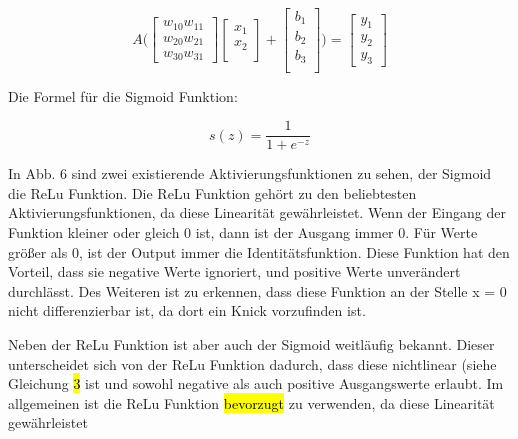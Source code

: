 \begin{equation}
\label{Feedforwards}
    
          A\Bigg(
         \begin{bmatrix}
           w_{10}  w_{11} \\     
           w_{20}  w_{21} \\           
           w_{30} w_{31}
          \end{bmatrix}
          \begin{bmatrix}
           x_{1} \\
           x_{2} \\
         \end{bmatrix}
         + 
         \begin{bmatrix}
           b_{1} \\
           b_{2} \\
           b_{3} \\
         \end{bmatrix}
            \Bigg)
          =
          \begin{bmatrix}
           y_{1} \\
           y_{2} \\
     
           y_{3}
         \end{bmatrix}
         
\end{equation}



Die Formel für die Sigmoid Funktion: 

\begin{equation}
\label{Sigmoid}
s(z) = \frac{1}{1+e^{-z}}
\end{equation}


In Abb. 6 sind zwei existierende Aktivierungsfunktionen zu sehen, der Sigmoid die ReLu Funktion. Die ReLu Funktion gehört zu den beliebtesten Aktivierungsfunktionen, da diese Linearität gewährleistet. Wenn der Eingang der Funktion kleiner oder gleich 0 ist, dann ist der Ausgang immer 0. Für Werte größer als 0, ist der Output immer die Identitätsfunktion. Diese Funktion hat den Vorteil, dass sie negative Werte ignoriert, und positive Werte unverändert durchlässt. Des Weiteren ist zu erkennen, dass diese Funktion an der Stelle x = 0 nicht differenzierbar ist, da dort ein Knick vorzufinden ist.

Neben der ReLu Funktion ist aber auch der Sigmoid weitläufig bekannt. Dieser unterscheidet sich von der ReLu Funktion dadurch, dass diese nichtlinear (siehe Gleichung \hl{3} ist und sowohl negative als auch positive Ausgangswerte erlaubt. Im allgemeinen ist die ReLu Funktion \hl{bevorzugt} zu verwenden, da diese Linearität gewährleistet


